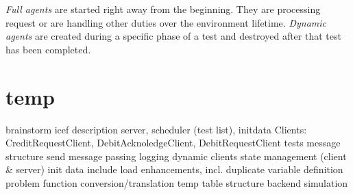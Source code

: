 \textit{Full agents} are started right away from the beginning. They are processing request or are handling other duties over the environment lifetime. \textit{Dynamic agents} are created during a specific phase of a test and destroyed after that test has been completed.

\section{temp}

brainstorm
  icef description
    server, scheduler (test list), initdata
    Clients: CreditRequestClient, DebitAcknoledgeClient, DebitRequestClient
  tests  
  message structure send
  message passing
  logging
  dynamic clients
  state management (client \& server)
  init data
  include load enhancements, incl. duplicate variable definition problem  
  function conversion/translation
  temp table structure
  backend simulation
  
